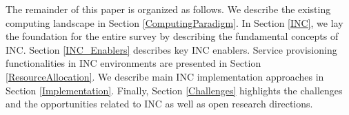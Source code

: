 The remainder of this paper is organized as follows. We describe the existing computing landscape in Section \ref{ComputingParadigm}. In Section \ref{INC}, we lay the foundation for the entire survey by describing the fundamental concepts of INC. Section \ref{INC_Enablers} describes key INC enablers. Service provisioning functionalities in INC environments are presented in Section \ref{ResourceAllocation}. We describe main INC implementation approaches in Section \ref{Implementation}. Finally, Section \ref{Challenges} highlights the challenges and the opportunities related to INC as well as open research directions. 

